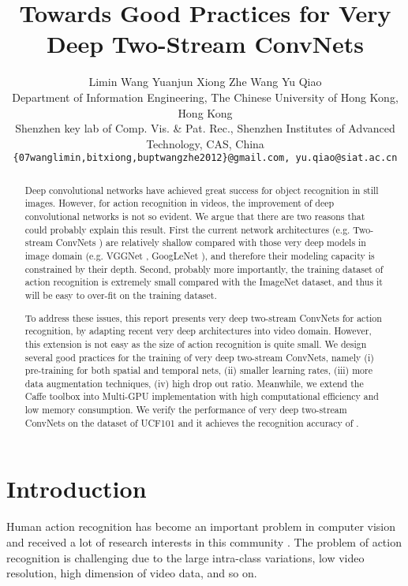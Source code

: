 \documentclass[10pt,twocolumn,letterpaper]{article}
\begin{document}
\title{Towards Good Practices for Very Deep Two-Stream ConvNets}

\author{Limin Wang \quad \quad Yuanjun Xiong \quad \quad Zhe Wang \quad \quad Yu Qiao \\
\small Department of Information Engineering, The Chinese University of Hong Kong, Hong Kong \\
\small Shenzhen key lab of Comp. Vis. \& Pat. Rec.,  Shenzhen Institutes of Advanced Technology, CAS, China \\
{\tt\small \{07wanglimin,bitxiong,buptwangzhe2012\}@gmail.com, yu.qiao@siat.ac.cn}
}

\maketitle

\begin{abstract}
  Deep convolutional networks have achieved great success for object recognition in still images. However, for action recognition in videos, the improvement of deep convolutional networks is not so evident. We argue that there are two reasons that could probably explain this result. First the current network architectures (e.g. Two-stream ConvNets \cite{SimonyanZ14}) are relatively shallow compared with those very deep models in image domain (e.g. VGGNet \cite{SimonyanZ14a}, GoogLeNet \cite{SzegedyLJSRAEVR14}), and therefore their modeling capacity is constrained by their depth. Second, probably more importantly, the training dataset of action recognition is extremely small compared with the ImageNet dataset, and thus it will be easy to over-fit on the training dataset.
  
  To address these issues, this report presents very deep two-stream ConvNets for action recognition, by adapting recent very deep architectures into video domain. However, this extension is not easy as the size of action recognition is quite small. We design several good practices for the training of very deep two-stream ConvNets, namely (i) pre-training for both spatial and temporal nets, (ii) smaller learning rates, (iii) more data augmentation techniques, (iv) high drop out ratio. Meanwhile, we extend the Caffe toolbox into Multi-GPU implementation with high computational efficiency and low memory consumption. We verify the performance of very deep two-stream ConvNets on the dataset of UCF101 and it achieves the recognition accuracy of .
\end{abstract}

\section{Introduction}
Human action recognition has become an important problem in computer vision and received a lot of research interests in this community \cite{SimonyanZ14,WangS13a,WangQT15a}. The problem of action recognition is challenging due to the large intra-class variations, low video resolution, high dimension of video data, and so on.
\end{document}
